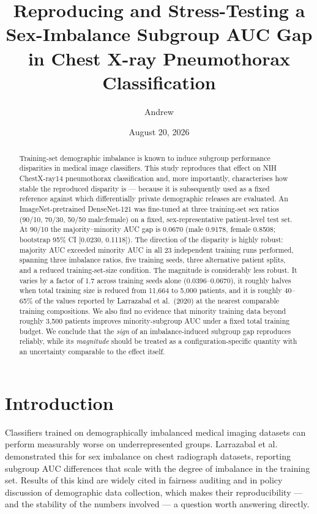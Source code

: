 \documentclass[11pt]{article}
\title{Reproducing and Stress-Testing a Sex-Imbalance Subgroup AUC Gap\\ in Chest X-ray Pneumothorax Classification}
\author{Andrew}
\date{August 20, 2026}
\begin{document}
\maketitle

\begin{abstract}
\noindent Training-set demographic imbalance is known to induce subgroup performance disparities in medical image classifiers. This study reproduces that effect on NIH ChestX-ray14 pneumothorax classification and, more importantly, characterises how stable the reproduced disparity is --- because it is subsequently used as a fixed reference against which differentially private demographic releases are evaluated. An ImageNet-pretrained DenseNet-121 was fine-tuned at three training-set sex ratios (90/10, 70/30, 50/50 male:female) on a fixed, sex-representative patient-level test set. At 90/10 the majority--minority AUC gap is 0.0670 (male 0.9178, female 0.8508; bootstrap 95\% CI [0.0230, 0.1118]). The direction of the disparity is highly robust: majority AUC exceeded minority AUC in all 23 independent training runs performed, spanning three imbalance ratios, five training seeds, three alternative patient splits, and a reduced training-set-size condition. The magnitude is considerably less robust. It varies by a factor of 1.7 across training seeds alone (0.0396--0.0670), it roughly halves when total training size is reduced from 11,664 to 5,000 patients, and it is roughly 40--65\% of the values reported by Larrazabal et al.\ (2020) at the nearest comparable training compositions. We also find no evidence that minority training data beyond roughly 3,500 patients improves minority-subgroup AUC under a fixed total training budget. We conclude that the \emph{sign} of an imbalance-induced subgroup gap reproduces reliably, while its \emph{magnitude} should be treated as a configuration-specific quantity with an uncertainty comparable to the effect itself.
\end{abstract}

\section{Introduction}

Classifiers trained on demographically imbalanced medical imaging datasets can perform measurably worse on underrepresented groups. Larrazabal et al.\ \cite{larrazabal2020} demonstrated this for sex imbalance on chest radiograph datasets, reporting subgroup AUC differences that scale with the degree of imbalance in the training set. Results of this kind are widely cited in fairness auditing and in policy discussion of demographic data collection, which makes their reproducibility --- and the stability of the numbers involved --- a question worth answering directly.
\end{document}

